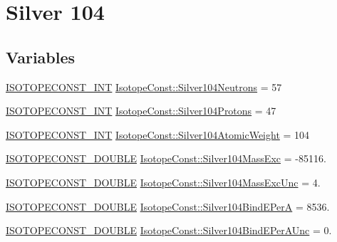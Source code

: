 \hypertarget{group___isotope_const-_silver-_ag104}{}\section{Silver 104}
\label{group___isotope_const-_silver-_ag104}
\subsection*{Variables}
\begin{DoxyCompactItemize}
\item 
\mbox{\hyperlink{group___isotope_const-_macros_ga5f18360b3e99483a35c32d789e62621c}{I\+S\+O\+T\+O\+P\+E\+C\+O\+N\+S\+T\+\_\+\+I\+NT}} \mbox{\hyperlink{group___isotope_const-_silver-_ag104_ga938df038de76975f2063d0b50f36ee7e}{Isotope\+Const\+::\+Silver104\+Neutrons}} = 57
\item 
\mbox{\hyperlink{group___isotope_const-_macros_ga5f18360b3e99483a35c32d789e62621c}{I\+S\+O\+T\+O\+P\+E\+C\+O\+N\+S\+T\+\_\+\+I\+NT}} \mbox{\hyperlink{group___isotope_const-_silver-_ag104_ga644f8aa356ce8d85a84233c79a194a03}{Isotope\+Const\+::\+Silver104\+Protons}} = 47
\item 
\mbox{\hyperlink{group___isotope_const-_macros_ga5f18360b3e99483a35c32d789e62621c}{I\+S\+O\+T\+O\+P\+E\+C\+O\+N\+S\+T\+\_\+\+I\+NT}} \mbox{\hyperlink{group___isotope_const-_silver-_ag104_ga3d0ea313ed64ca13c5486f54e72536b9}{Isotope\+Const\+::\+Silver104\+Atomic\+Weight}} = 104
\item 
\mbox{\hyperlink{group___isotope_const-_macros_ga8f45a7272ce02c0b4c65c44636ed719a}{I\+S\+O\+T\+O\+P\+E\+C\+O\+N\+S\+T\+\_\+\+D\+O\+U\+B\+LE}} \mbox{\hyperlink{group___isotope_const-_silver-_ag104_ga41ee942c14dc8e51bc19f09256ed9ff1}{Isotope\+Const\+::\+Silver104\+Mass\+Exc}} = -\/85116.
\item 
\mbox{\hyperlink{group___isotope_const-_macros_ga8f45a7272ce02c0b4c65c44636ed719a}{I\+S\+O\+T\+O\+P\+E\+C\+O\+N\+S\+T\+\_\+\+D\+O\+U\+B\+LE}} \mbox{\hyperlink{group___isotope_const-_silver-_ag104_gaeb32beedc56216f10b27ce401b03c872}{Isotope\+Const\+::\+Silver104\+Mass\+Exc\+Unc}} = 4.
\item 
\mbox{\hyperlink{group___isotope_const-_macros_ga8f45a7272ce02c0b4c65c44636ed719a}{I\+S\+O\+T\+O\+P\+E\+C\+O\+N\+S\+T\+\_\+\+D\+O\+U\+B\+LE}} \mbox{\hyperlink{group___isotope_const-_silver-_ag104_ga42643bc9ef9ee4f63fcded7559030d1e}{Isotope\+Const\+::\+Silver104\+Bind\+E\+PerA}} = 8536.
\item 
\mbox{\hyperlink{group___isotope_const-_macros_ga8f45a7272ce02c0b4c65c44636ed719a}{I\+S\+O\+T\+O\+P\+E\+C\+O\+N\+S\+T\+\_\+\+D\+O\+U\+B\+LE}} \mbox{\hyperlink{group___isotope_const-_silver-_ag104_ga379a95d0a9771c3fca4d8b4009828add}{Isotope\+Const\+::\+Silver104\+Bind\+E\+Per\+A\+Unc}} = 0.

\end{DoxyCompactItemize}
